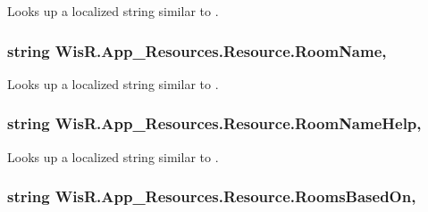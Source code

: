 Looks up a localized string similar to . 

\hypertarget{class_wis_r_1_1_app___resources_1_1_resource_a739ebb892d03a5ad2124028061c6af2c}{}
\subsubsection[{Room\+Name}]{\setlength{\rightskip}{0pt plus 5cm}string Wis\+R.\+App\+\_\+\+Resources.\+Resource.\+Room\+Name\hspace{0.3cm}{\ttfamily [static]}, {\ttfamily [get]}}\label{class_wis_r_1_1_app___resources_1_1_resource_a739ebb892d03a5ad2124028061c6af2c}


Looks up a localized string similar to . 

\hypertarget{class_wis_r_1_1_app___resources_1_1_resource_a3b6a4e008bc41b09a79baca154a132b6}{}
\subsubsection[{Room\+Name\+Help}]{\setlength{\rightskip}{0pt plus 5cm}string Wis\+R.\+App\+\_\+\+Resources.\+Resource.\+Room\+Name\+Help\hspace{0.3cm}{\ttfamily [static]}, {\ttfamily [get]}}\label{class_wis_r_1_1_app___resources_1_1_resource_a3b6a4e008bc41b09a79baca154a132b6}


Looks up a localized string similar to . 

\hypertarget{class_wis_r_1_1_app___resources_1_1_resource_a3f421217b8a91f567e91641ed754dfc3}{}
\subsubsection[{Rooms\+Based\+On}]{\setlength{\rightskip}{0pt plus 5cm}string Wis\+R.\+App\+\_\+\+Resources.\+Resource.\+Rooms\+Based\+On\hspace{0.3cm}{\ttfamily [static]}, {\ttfamily [get]}}\label{class_wis_r_1_1_app___resources_1_1_resource_a3f421217b8a91f567e91641ed754dfc3}


